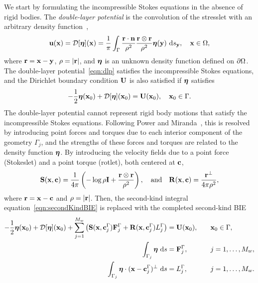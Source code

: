\documentclass[AMA,STIX1COL]{WileyNJD-v2}
\begin{document}
We start by formulating the incompressible Stokes equations in the
absence of rigid bodies.  The {\em double-layer potential} is the
convolution of the stresslet with an arbitrary density
function~\cite{Ladyzhenskaya1963, Pozrikidis1992},
\begin{align}
  \label{eqn:dlp}
  {\mathbf{u}}({\mathbf{x}}) = {\mathcal{D}}[{\boldsymbol\eta}]({\mathbf{x}}) = \frac{1}{\pi}\int_{\Gamma}
  \frac{{\mathbf{r}}\cdot{\mathbf{n}}}{\rho^2}\frac{{\mathbf{r}} \otimes {\mathbf{r}}}{\rho^2}
  {\boldsymbol\eta}({\mathbf{y}})~\text{d}s_{{\mathbf{y}}}, \quad {\mathbf{x}} \in \Omega,
\end{align}
where ${\mathbf{r}} = {\mathbf{x}} - {\mathbf{y}}$, $\rho=|{\mathbf{r}}|$, and ${\boldsymbol\eta}$ is an unknown density
function defined on ${\partial}\Omega$.  The double-layer
potential~\eqref{eqn:dlp} satisfies the incompressible Stokes equations,
and the Dirichlet boundary condition ${\mathbf{U}}$ is also satisfied if
${\boldsymbol\eta}$ satisfies~\cite{Pozrikidis1992}
\begin{align}
  -\frac{1}{2} {\boldsymbol\eta}({\mathbf{x}}_0) + {\mathcal{D}}[{\boldsymbol\eta}]({\mathbf{x}}_0) = {\mathbf{U}}({\mathbf{x}}_0), 
    \quad {\mathbf{x}}_0 \in \Gamma.
  \label{eqn:secondKindBIE}
\end{align}
The double-layer potential cannot represent rigid body motions that
satisfy the incompressible Stokes equations.  Following Power and
Miranda~\cite{Power1987, Power1993}, this is resolved by introducing
point forces and torques due to each interior component of the geometry
$\Gamma_j$, and the strengths of these forces and torques are related to
the density function ${\boldsymbol\eta}$.  By introducing the velocity fields due to
a point force (Stokeslet) and a point torque (rotlet), both centered at
${\mathbf{c}}$,
\begin{align*}
  \mathbf{S}({\mathbf{x}},{\mathbf{c}}) = \frac{1}{4\pi}\left(-\log\rho\mathbf{I} + 
  \frac{{\mathbf{r}} \otimes {\mathbf{r}}}{\rho^2}\right), \quad \text{and} \quad
  \mathbf{R}({\mathbf{x}},{\mathbf{c}}) = \frac{{\mathbf{r}}^\perp}{4\pi\rho^2},
\end{align*}
where ${\mathbf{r}} = {\mathbf{x}} - {\mathbf{c}}$ and $\rho = |{\mathbf{r}}|$.  Then, the second-kind
integral equation~\eqref{eqn:secondKindBIE} is replaced with the
completed second-kind BIE
\begin{equation}
  \label{eqn:completed_DLP}
  \begin{aligned}
  -\frac{1}{2}{\boldsymbol\eta}({\mathbf{x}}_0) + {\mathcal{D}}[{\boldsymbol\eta}]({\mathbf{x}}_0) + 
    \sum_{j=1}^{M_w} \left(\mathbf{S}({\mathbf{x}},{\mathbf{c}}^\Gamma_j){\mathbf{F}}^\Gamma_j + 
      \mathbf{R}({\mathbf{x}},{\mathbf{c}}^\Gamma_j)L^\Gamma_j\right) &= {\mathbf{U}}({\mathbf{x}}_0),
      \quad &&{\mathbf{x}}_0 \in \Gamma, \\
  \int_{\Gamma_j} {\boldsymbol\eta}~\text{d}s &= {\mathbf{F}}^\Gamma_j, 
      &&j=1,\ldots,M_w, \\
  \int_{\Gamma_j} {\boldsymbol\eta}\cdot ({\mathbf{x}} - {\mathbf{c}}^\Gamma_j)^\perp~\text{d}s &=   
      L^\Gamma_j, &&j=1,\ldots,M_w.
\end{aligned}
\end{equation}
\end{document}
